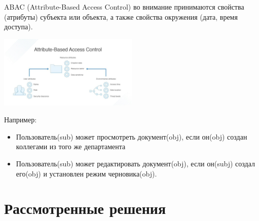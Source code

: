 \documentclass[presentation]{beamer}
\begin{document}
\begin{frame}[label={sec:orgcf7b9c8}]{ABAC (Attribute-Based Access Control)}
во внимание принимаются свойства (атрибуты) субъекта или объекта, а также свойства окружения (дата, время доступа).

\begin{center}
\includegraphics[width=0.5\textwidth]{./img/abac.jpg}
\end{center}
Например:
\begin{itemize}
\item Пользователь(sub) может просмотреть документ(obj), если он(obj) создан коллегами из того же департамента
\item Пользователь(sub) может редактировать документ(obj), если он(subj) создал его(obj) и установлен режим черновика(obj).
\end{itemize}
\end{frame}

\section{Рассмотренные решения}
\label{sec:org0e9d8e4}
\end{document}

